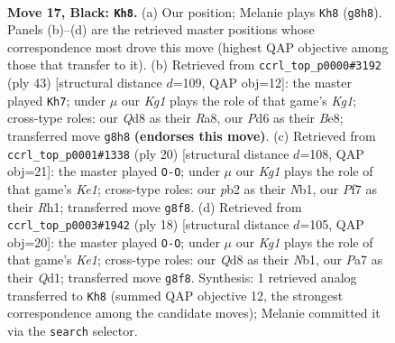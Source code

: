 \documentclass[11pt]{article}
\begin{document}
\clearpage

\begin{figure}[p]\centering
\begin{subfigure}{0.46\textwidth}\centering
\resizebox{\linewidth}{!}{%
\newchessgame
\chessboard[
  setfen={rn1qr1k1/p2n1p1P/1p1p1b2/2pP2p1/P3P1P1/2N5/1P2N3/R1BQK2R b KQ - 0 17},
  showmover=false,
  pgfstyle=straightmove, color=movearrow, markmove={g8-h8}
]}
\caption{}
\end{subfigure}\hfill
\begin{subfigure}{0.46\textwidth}\centering
\resizebox{\linewidth}{!}{%
\newchessgame
\chessboard[
  setfen={r1r1b1k1/3nq1p1/p4n1p/1p2pp2/8/1PNNP2P/PQR2PP1/3R1BK1 b - - 1 22},
  showmover=false,
  pgfstyle=straightmove, color=movearrow, markmove={g8-h7}
]}
\caption{}
\end{subfigure}
\\[4pt]
\begin{subfigure}{0.46\textwidth}\centering
\resizebox{\linewidth}{!}{%
\newchessgame
\chessboard[
  setfen={rnb1k2r/1p3ppp/p2q1n2/3p4/3P4/1PP2N2/4BPPP/RN1QK2R w KQkq - 1 11},
  showmover=false,
  pgfstyle=straightmove, color=movearrow, markmove={e1-g1}
]}
\caption{}
\end{subfigure}\hfill
\begin{subfigure}{0.46\textwidth}\centering
\resizebox{\linewidth}{!}{%
\newchessgame
\chessboard[
  setfen={rnbqk2r/1p3ppp/p2b1n2/3p4/3P4/1PPBBN2/5PPP/RN1QK2R w KQkq - 3 10},
  showmover=false,
  pgfstyle=straightmove, color=movearrow, markmove={e1-g1}
]}
\caption{}
\end{subfigure}
\caption{\textbf{Move 17, Black: \texttt{Kh8}.} (a) Our position; Melanie plays \texttt{Kh8} (\texttt{g8h8}). Panels (b)--(d) are the retrieved master positions whose correspondence most drove this move (highest QAP objective among those that transfer to it). (b) Retrieved from \texttt{ccrl\_top\_p0000\#3192} (ply 43) [structural distance $d$=109, QAP obj=12]: the master played \texttt{Kh7}; under $\mu$ our \emph{Kg1} plays the role of that game's \emph{Kg1}; cross-type roles: our \emph{Q}d8 as their \emph{R}a8, our \emph{P}d6 as their \emph{B}e8; transferred move \texttt{g8h8} \textbf{(endorses this move)}. (c) Retrieved from \texttt{ccrl\_top\_p0001\#1338} (ply 20) [structural distance $d$=108, QAP obj=21]: the master played \texttt{O-O}; under $\mu$ our \emph{Kg1} plays the role of that game's \emph{Ke1}; cross-type roles: our \emph{p}b2 as their \emph{N}b1, our \emph{P}f7 as their \emph{R}h1; transferred move \texttt{g8f8}. (d) Retrieved from \texttt{ccrl\_top\_p0003\#1942} (ply 18) [structural distance $d$=105, QAP obj=20]: the master played \texttt{O-O}; under $\mu$ our \emph{Kg1} plays the role of that game's \emph{Ke1}; cross-type roles: our \emph{Q}d8 as their \emph{N}b1, our \emph{P}a7 as their \emph{Q}d1; transferred move \texttt{g8f8}. Synthesis: 1 retrieved analog transferred to \texttt{Kh8} (summed QAP objective 12, the strongest correspondence among the candidate moves); Melanie committed it via the \texttt{search} selector.}
\label{fig:thought-m33}
\end{figure}
\end{document}
